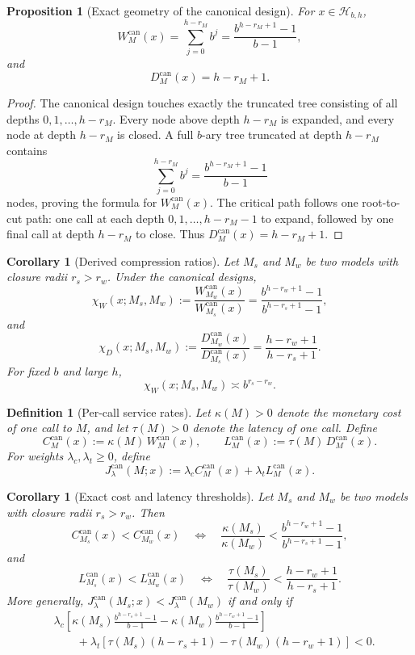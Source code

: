 \documentclass[10pt]{article}
\theoremstyle{paperplain}
\newtheorem{proposition}[theorem]{Proposition}
\newtheorem{corollary}[theorem]{Corollary}
\theoremstyle{paperdefinition}
\newtheorem{definition}[theorem]{Definition}
\theoremstyle{paperremark}
\begin{document}
\begin{proposition}[Exact geometry of the canonical design]
\label{prop:canonical-geometry}
For $x\in\mathcal H_{b,h}$,
\[
W_M^{\mathrm{can}}(x)
=
\sum_{j=0}^{h-r_M} b^j
=
\frac{b^{h-r_M+1}-1}{b-1},
\]
and
\[
D_M^{\mathrm{can}}(x)=h-r_M+1.
\]
\end{proposition}

\begin{proof}
The canonical design touches exactly the truncated tree consisting of all depths $0,1,\dots,h-r_M$.
Every node above depth $h-r_M$ is expanded, and every node at depth $h-r_M$ is closed.
A full $b$-ary tree truncated at depth $h-r_M$ contains
\[
\sum_{j=0}^{h-r_M} b^j
=
\frac{b^{h-r_M+1}-1}{b-1}
\]
nodes, proving the formula for $W_M^{\mathrm{can}}(x)$.
The critical path follows one root-to-cut path: one call at each depth $0,1,\dots,h-r_M-1$ to expand, followed by one final call at depth $h-r_M$ to close.
Thus $D_M^{\mathrm{can}}(x)=h-r_M+1$.
\end{proof}

\begin{corollary}[Derived compression ratios]
\label{cor:derived-compression}
Let $M_s$ and $M_w$ be two models with closure radii $r_s>r_w$.
Under the canonical designs,
\[
\chi_W(x;M_s,M_w)
:=
\frac{W_{M_w}^{\mathrm{can}}(x)}{W_{M_s}^{\mathrm{can}}(x)}
=
\frac{b^{h-r_w+1}-1}{b^{h-r_s+1}-1},
\]
and
\[
\chi_D(x;M_s,M_w)
:=
\frac{D_{M_w}^{\mathrm{can}}(x)}{D_{M_s}^{\mathrm{can}}(x)}
=
\frac{h-r_w+1}{h-r_s+1}.
\]
For fixed $b$ and large $h$,
\[
\chi_W(x;M_s,M_w)\asymp b^{r_s-r_w}.
\]
\end{corollary}

\begin{definition}[Per-call service rates]
\label{def:per-call-rates}
Let $\kappa(M)>0$ denote the monetary cost of one call to $M$, and let $\tau(M)>0$ denote the latency of one call.
Define
\[
C_M^{\mathrm{can}}(x):=\kappa(M)\,W_M^{\mathrm{can}}(x),
\qquad
L_M^{\mathrm{can}}(x):=\tau(M)\,D_M^{\mathrm{can}}(x).
\]
For weights $\lambda_c,\lambda_t\ge 0$, define
\[
J_\lambda^{\mathrm{can}}(M;x)
:=
\lambda_c C_M^{\mathrm{can}}(x)+\lambda_t L_M^{\mathrm{can}}(x).
\]
\end{definition}

\begin{corollary}[Exact cost and latency thresholds]
\label{cor:exact-thresholds}
Let $M_s$ and $M_w$ be two models with closure radii $r_s>r_w$.
Then
\[
C_{M_s}^{\mathrm{can}}(x)<C_{M_w}^{\mathrm{can}}(x)
\quad\Longleftrightarrow\quad
\frac{\kappa(M_s)}{\kappa(M_w)}
<
\frac{b^{h-r_w+1}-1}{b^{h-r_s+1}-1},
\]
and
\[
L_{M_s}^{\mathrm{can}}(x)<L_{M_w}^{\mathrm{can}}(x)
\quad\Longleftrightarrow\quad
\frac{\tau(M_s)}{\tau(M_w)}
<
\frac{h-r_w+1}{h-r_s+1}.
\]
More generally, $J_\lambda^{\mathrm{can}}(M_s;x)<J_\lambda^{\mathrm{can}}(M_w)$ if and only if
\[
\begin{aligned}
&\lambda_c\!\left[
\kappa(M_s)\frac{b^{h-r_s+1}-1}{b-1}
-
\kappa(M_w)\frac{b^{h-r_w+1}-1}{b-1}
\right] \\
&\qquad+
\lambda_t\!\left[
\tau(M_s)(h-r_s+1)-\tau(M_w)(h-r_w+1)
\right]
<0.
\end{aligned}
\]
\end{corollary}
\end{document}
